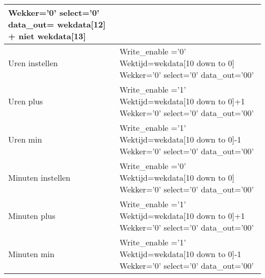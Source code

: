 \documentclass[a4paper, oneside, 10pt]{article}
\begin{document}
\begin{longtable}{|l| p{10cm} |}
Wekker='0' \newline
select='0' \newline
data{\_}out= wekdata[12] + niet wekdata[13] \\ \hline
Uren instellen &
Write{\_}enable ='0' \newline
Wektijd=wekdata[10 down to 0] \newline
Wekker='0' \newline
select='0' \newline
data{\_}out='00' \\ \hline
Uren plus &
Write{\_}enable ='1' \newline
Wektijd=wekdata[10 down to 0]+1 \newline
Wekker='0' \newline
select='0' \newline
data{\_}out='00' \\ \hline
Uren min &
Write{\_}enable ='1' \newline
Wektijd=wekdata[10 down to 0]-1 \newline
Wekker='0' \newline
select='0' \newline
data{\_}out='00' \\ \hline
Minuten instellen &
Write{\_}enable ='0' \newline
Wektijd=wekdata[10 down to 0] \newline
Wekker='0' \newline
select='0' \newline
data{\_}out='00' \\ \hline
Minuten plus &
Write{\_}enable ='1' \newline
Wektijd=wekdata[10 down to 0]+1 \newline
Wekker='0' \newline
select='0' \newline
data{\_}out='00' \\ \hline
Minuten min &
Write{\_}enable ='1' \newline
Wektijd=wekdata[10 down to 0]-1 \newline
Wekker='0' \newline
select='0' \newline
data{\_}out='00' \\ \hline
\end{longtable}
\end{document}
